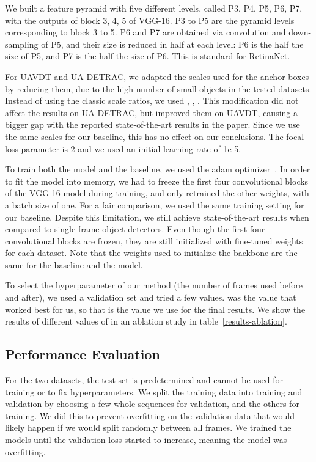 \documentclass[runningheads]{llncs}
\begin{document}
We built a feature pyramid with five different levels, called P3, P4, P5, P6, P7, with the outputs of block 3, 4, 5 of VGG-16. P3 to P5 are the pyramid levels corresponding to block 3 to 5. P6 and P7 are obtained via convolution and down-sampling of P5, and their size is reduced in half at each level: P6 is the half the size of P5, and P7 is the half the size of P6. This is standard for RetinaNet. 

For UAVDT and UA-DETRAC, we adapted the scales used for the anchor boxes by reducing them, due to the high number of small objects in the tested datasets. Instead of using the classic  scale ratios, we used , , . This modification did not affect the results on UA-DETRAC, but improved them on UAVDT, causing a bigger gap with the reported state-of-the-art results in the paper. Since we use the same scales for our baseline, this has no effect on our conclusions. The focal loss parameter  is 2 and we used an initial learning rate of 1e-5.

To train both the model and the baseline, we used the adam optimizer~\cite{kingma2014adam}. In order to fit the model into memory, we had to freeze the first four convolutional blocks of the VGG-16 model during training, and only retrained the other weights, with a batch size of one. For a fair comparison, we used the same training setting for our baseline. Despite this limitation, we still achieve state-of-the-art results when compared to single frame object detectors. Even though the first four convolutional blocks are frozen, they are still initialized with fine-tuned weights for each dataset. Note that the weights used to initialize the backbone are the same for the baseline and the model. 

To select the hyperparameter  of our method (the number of frames used before and after), we used a validation set and tried a few values.  was the value that worked best for us, so that is the value we use for the final results. We show the results of different values of  in an ablation study in table~\ref{results-ablation}.



\subsection{Performance Evaluation}
For the two datasets, the test set is predetermined and cannot be used for training or to fix hyperparameters. We split the training data into training and validation by choosing a few whole sequences for validation, and the others for training. We did this to prevent overfitting on the validation data that would likely happen if we would split randomly between all frames. We trained the models until the validation loss started to increase, meaning the model was overfitting.
\end{document}
